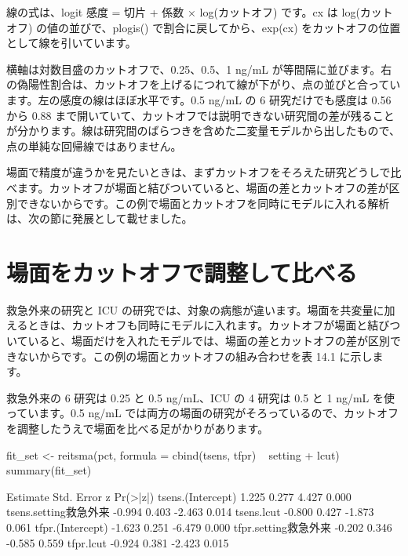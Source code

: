 線の式は、logit 感度 = 切片 + 係数 × log(カットオフ) です。cx は log(カットオフ) の値の並びで、plogis() で割合に戻してから、exp(cx) をカットオフの位置として線を引いています。

横軸は対数目盛のカットオフで、0.25、0.5、1 ng/mL が等間隔に並びます。右の偽陽性割合は、カットオフを上げるにつれて線が下がり、点の並びと合っています。左の感度の線はほぼ水平です。0.5 ng/mL の 6 研究だけでも感度は 0.56 から 0.88 まで開いていて、カットオフでは説明できない研究間の差が残ることが分かります。線は研究間のばらつきを含めた二変量モデルから出したもので、点の単純な回帰線ではありません。

場面で精度が違うかを見たいときは、まずカットオフをそろえた研究どうしで比べます。カットオフが場面と結びついていると、場面の差とカットオフの差が区別できないからです。この例で場面とカットオフを同時にモデルに入れる解析は、次の節に発展として載せました。

\section{\hatten 場面をカットオフで調整して比べる}
\label{sec:14-3}

救急外来の研究と ICU の研究では、対象の病態が違います。場面を共変量に加えるときは、カットオフも同時にモデルに入れます。カットオフが場面と結びついていると、場面だけを入れたモデルでは、場面の差とカットオフの差が区別できないからです。この例の場面とカットオフの組み合わせを表 14.1 に示します。

\begin{kkcenter}
\end{kkcenter}

救急外来の 6 研究は 0.25 と 0.5 ng/mL、ICU の 4 研究は 0.5 と 1 ng/mL を使っています。0.5 ng/mL では両方の場面の研究がそろっているので、カットオフを調整したうえで場面を比べる足がかりがあります。

\begin{rcode}
fit_set <- reitsma(pct,
  formula = cbind(tsens, tfpr) ~ setting + lcut)
summary(fit_set)
\end{rcode}

\begin{rout}
                      Estimate Std. Error      z Pr(>|z|)
tsens.(Intercept)        1.225      0.277  4.427    0.000
tsens.setting救急外来   -0.994      0.403 -2.463    0.014
tsens.lcut              -0.800      0.427 -1.873    0.061
tfpr.(Intercept)        -1.623      0.251 -6.479    0.000
tfpr.setting救急外来    -0.202      0.346 -0.585    0.559
tfpr.lcut               -0.924      0.381 -2.423    0.015
\end{rout}

